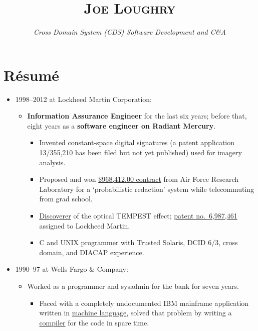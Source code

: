 \documentclass[12pt,letterpaper]{article}
\date{}
\title{\textsc{Joe Loughry}\vspace{-7mm}}
\author{\emph{Cross Domain System (CDS) Software Development and C\&A}}
\begin{document}
\maketitle
\thispagestyle{empty}

\vspace*{-20mm}
\section*{R\'esum\'e}

\begin{itemize}
	\item 1998--2012 at Lockheed Martin Corporation:
		\begin{itemize}
			\item \textbf{Information Assurance Engineer} for the last six years; before that,
				eight years as a \textbf{software engineer on Radiant Mercury}.
				\begin{itemize}
					\item Invented constant-space digital signatures (a patent application
						13/355,210 has been filed but not yet published) used for
						imagery analysis.
					\item Proposed and won
						\href{http://applied-math.org/Probabilistic_Redaction.pdf}{\$968,412.00
						contract} from Air Force Research Laboratory for a `probabilistic
						redaction' system while telecommuting from grad school.
					\item \href{http://applied-math.org/acm_optical_tempest.pdf}{Discoverer}
						of the optical TEMPEST effect;
						\href{http://www.google.com/patents/US6987461}{patent no.\ 6,987,461}
						assigned to Lockheed Martin.
					\item C and UNIX programmer with Trusted Solaris, DCID 6/3, cross domain,
						and DIACAP experience.
				\end{itemize}
		\end{itemize}

	\item 1990--97 at Wells Fargo \& Company:
		\begin{itemize}
			\item Worked as a programmer and sysadmin for the bank for seven years.
				\begin{itemize}
					\item Faced with a completely undocumented IBM mainframe application
						written in
						\href{https://github.com/jloughry/BANCStar/blob/master/README.md#code-sample}{machine language},
						solved that problem by writing a
						\href{https://github.com/jloughry/BANCStar/blob/master/C16LNAPP.pdf?raw=true}{compiler}
						for the code in spare time.
				\end{itemize}
		\end{itemize}


\end{itemize}
\end{document}
